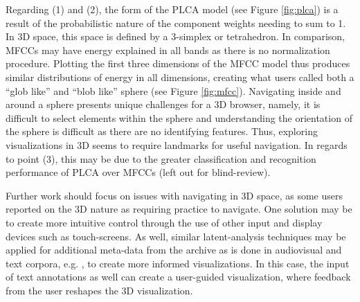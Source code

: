 Regarding (1) and (2), the form of the PLCA model (see Figure \ref{fig:plca}) is a result of the probabilistic nature of the component weights needing to sum to 1.  In 3D space, this space is defined by a 3-simplex or tetrahedron.  In comparison, MFCCs may have energy explained in all bands as there is no normalization procedure.  Plotting the first three dimensions of the MFCC model thus produces similar distributions of energy in all dimensions, creating what users called both a ``glob like'' and ``blob like'' sphere (see Figure \ref{fig:mfcc}).    Navigating inside and around a sphere presents unique challenges for a 3D browser, namely, it is difficult to select elements within the sphere and understanding the orientation of the sphere is difficult as there are no identifying features.  Thus, exploring visualizations in 3D seems to require landmarks for useful navigation.  In regards to point (3), this may be due to the greater classification and recognition performance of PLCA over MFCCs (left out for blind-review).  

Further work should focus on issues with navigating in 3D space, as some users reported on the 3D nature as requiring practice to navigate.  One solution may be to create more intuitive control through the use of other input and display devices such as touch-screens.  As well, similar latent-analysis techniques may be applied for additional meta-data from the archive as is done in audiovisual and text corpora, e.g. \cite{Himmel1998,Christel1998}, to create more informed visualizations.  In this case, the input of text annotations as well can create a user-guided visualization, where feedback from the user reshapes the 3D visualization. 

